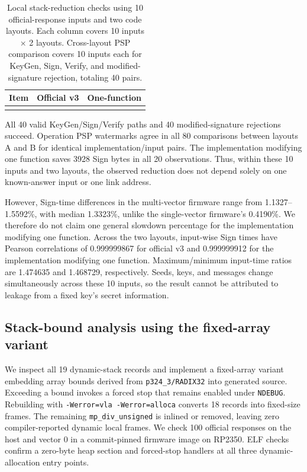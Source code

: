 \documentclass[a4paper,10pt]{article}
\theoremstyle{definition}
\theoremstyle{remark}
\begin{document}
\begin{table}[H]
  \centering
  \caption{Local stack-reduction checks using 10 official-response inputs and two code layouts. Each column covers 10 inputs $\times$ 2 layouts. Cross-layout PSP comparison covers 10 inputs each for KeyGen, Sign, Verify, and modified-signature rejection, totaling 40 pairs.}
  \label{tab:v3-multi}
  \small
  \begin{tabular}{@{}lrr@{}}
    \toprule
    Item & Official v3 & One-function \\
    \midrule
    \\
    \bottomrule
  \end{tabular}
\end{table}

All 40 valid KeyGen/Sign/Verify paths and 40 modified-signature rejections succeed. Operation PSP watermarks agree in all 80 comparisons between layouts A and B for identical implementation/input pairs. The implementation modifying one function saves \num{3928} Sign bytes in all 20 observations. Thus, within these 10 inputs and two layouts, the observed reduction does not depend solely on one known-answer input or one link address.

However, Sign-time differences in the multi-vector firmware range from \num{1.1327}--\num{1.5592}\%, with median \num{1.3323}\%, unlike the single-vector firmware's \num{0.4190}\%. We therefore do not claim one general slowdown percentage for the implementation modifying one function. Across the two layouts, input-wise Sign times have Pearson correlations of \num{0.999999867} for official v3 and \num{0.999999912} for the implementation modifying one function. Maximum/minimum input-time ratios are \num{1.474635} and \num{1.468729}, respectively. Seeds, keys, and messages change simultaneously across these 10 inputs, so the result cannot be attributed to leakage from a fixed key's secret information.

\subsection{Stack-bound analysis using the fixed-array variant}

We inspect all 19 dynamic-stack records and implement a fixed-array variant embedding array bounds derived from \texttt{p324\_3/RADIX32} into generated source. Exceeding a bound invokes a forced stop that remains enabled under \texttt{NDEBUG}. Rebuilding with \texttt{-Werror=vla -Werror=alloca} converts 18 records into fixed-size frames. The remaining \texttt{mp\_div\_unsigned} is inlined or removed, leaving zero compiler-reported dynamic local frames. We check 100 official responses on the host and vector 0 in a commit-pinned firmware image on RP2350. ELF checks confirm a zero-byte heap section and forced-stop handlers at all three dynamic-allocation entry points.
\end{document}
